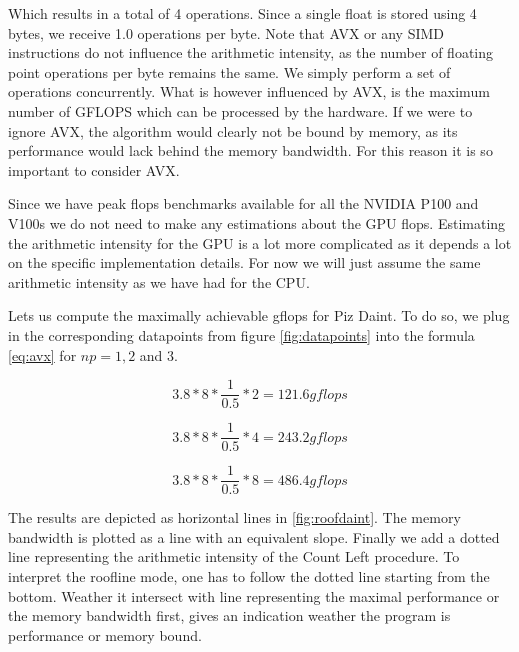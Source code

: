 \documentclass[]{article}
\begin{document}
Which results in a total of 4 operations. Since a single float is stored using 4 bytes, we receive 1.0 operations per byte. Note that AVX or any SIMD instructions do not influence the arithmetic intensity, as the number of floating point operations per byte remains the same. We simply perform a set of operations concurrently. What is however influenced by AVX, is the maximum number of GFLOPS which can be processed by the hardware. If we were to ignore AVX, the algorithm would clearly not be bound by memory, as its performance would lack behind the memory bandwidth. For this reason it is so important to consider AVX.

Since we have peak flops benchmarks available for all the NVIDIA P100 and V100s we do not need to make any estimations about the GPU flops. Estimating the arithmetic intensity for the GPU  is a lot more complicated as it depends a lot on the specific implementation details. For now we will just assume the same arithmetic intensity as we have had for the CPU.

Lets us compute the maximally achievable gflops for Piz Daint. To do so, we plug in the corresponding datapoints from figure \ref{fig:datapoints} into the formula \ref{eq:avx} for $np = 1, 2$ and $3$.

\begin{center}
	\begin{equation}
		3.8 * 8 * \frac{1}{0.5} * 2 = 121.6 gflops
	\end{equation}
	\label{eq:daintp1}
\end{center}

\begin{center}
	\begin{equation}
		3.8 * 8 * \frac{1}{0.5} * 4 = 243.2 gflops
	\end{equation}
	\label{eq:daintp2}
\end{center}

\begin{center}
	\begin{equation}
		3.8 * 8 * \frac{1}{0.5} * 8 = 486.4 gflops
	\end{equation}
	\label{eq:daintp3}
\end{center}

The results are depicted as horizontal lines in \ref{fig:roofdaint}. The memory bandwidth is plotted as a line with an equivalent slope. Finally we add a dotted line representing the arithmetic intensity of the Count Left procedure. 
To interpret the roofline mode, one has to follow the dotted line starting from the bottom. Weather it intersect with line representing the maximal performance or the memory bandwidth first, gives an indication weather the program is performance or memory bound. 
\end{document}
